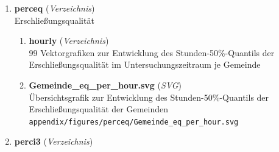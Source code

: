 \begin{enumerate}[label=\arabic*, leftmargin=*, itemsep=0.5em, topsep=0.3em]
\begin{enumerate}[label=\arabic{enumi}.\arabic*, leftmargin=*, itemsep=0.5em, topsep=0.3em]
\begin{enumerate}[label=\arabic{enumi}.\arabic{enumii}.\arabic*, leftmargin=*, itemsep=0.5em, topsep=0.3em]
\begin{enumerate}[label=\arabic{enumi}.\arabic{enumii}.\arabic{enumiii}.\arabic*, leftmargin=*, itemsep=0.5em, topsep=0.3em]
\texttt{\small appendix/figures/percbq/Gemeinde\_bq\_per\_hour.svg}
\item \textbf{Kreis\_bq\_per\_date.svg} \textnormal{(\textit{SVG})}\\
Übersichtsgrafik zur Entwicklung des Tages-50\%-Quantils der Bedienungsqualität der Kreise\\
\texttt{\small appendix/figures/percbq/Kreis\_bq\_per\_date.svg}
\item \textbf{Kreis\_bq\_per\_hour.svg} \textnormal{(\textit{SVG})}\\
Übersichtsgrafik zur Entwicklung des Stunden-50\%-Quantils der Bedienungsqualität der Kreise\\
\texttt{\small appendix/figures/percbq/Kreis\_bq\_per\_hour.svg}
\item \textbf{RegioStar7\_bq\_per\_date.svg} \textnormal{(\textit{SVG})}\\
Übersichtsgrafik zur Entwicklung des Tages-50\%-Quantils der Bedienungsqualität der RegioStaR7-Klassen\\
\texttt{\small appendix/figures/percbq/RegioStar7\_bq\_per\_date.svg}
\item \textbf{RegioStaR7\_bq\_per\_hour.svg} \textnormal{(\textit{SVG})}\\
Übersichtsgrafik zur Entwicklung des Stunden-50\%-Quantils der Bedienungsqualität der RegioStaR7-Klassen\\
\texttt{\small appendix/figures/percbq/RegioStaR7\_bq\_per\_hour.svg}
\end{enumerate}
\item \textbf{perceq} \textnormal{(\textit{Verzeichnis})}\\
Erschließungsqualität
\begin{enumerate}[label=\arabic{enumi}.\arabic{enumii}.\arabic{enumiii}.\arabic*, leftmargin=*, itemsep=0.5em, topsep=0.3em]
\item \textbf{hourly} \textnormal{(\textit{Verzeichnis})}\\
99 Vektorgrafiken zur Entwicklung des Stunden-50\%-Quantils der Erschließungsqualität im Untersuchungszeitraum je Gemeinde
\item \textbf{Gemeinde\_eq\_per\_hour.svg} \textnormal{(\textit{SVG})}\\
Übersichtsgrafik zur Entwicklung des Stunden-50\%-Quantils der Erschließungsqualität der Gemeinden\\
\texttt{\small appendix/figures/perceq/Gemeinde\_eq\_per\_hour.svg}
\end{enumerate}
\item \textbf{perci3} \textnormal{(\textit{Verzeichnis})}\\

\end{enumerate}
\end{enumerate}
\end{enumerate}
